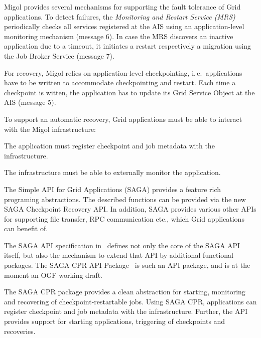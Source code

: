 \documentclass[times, 10pt, twocolumn]{article}
\begin{document}
Migol provides several mechanisms for supporting the fault tolerance of Grid applications.
To detect failures, the \emph{Monitoring and Restart Service (MRS)}
periodically checks all services registered at the AIS using an
application-level monitoring mechanism (message 6). In case the MRS discovers an inactive
application due to a timeout, it initiates a restart respectively a migration using the
Job Broker Service (message 7).  

For recovery, Migol relies on application-level checkpointing, i.\,e.\ applications have to be
written to accommodate checkpointing and restart. 
Each time a checkpoint is witten, the application has to update
its Grid Service Object at the AIS (message 5). 

To support an automatic recovery, Grid applications must be able to interact with the Migol infrastructure:
\begin{compactitem}
    \item The application must register checkpoint and job metadata with the infrastructure.
    \item The infrastructure must be able to externally monitor the application.
\end{compactitem}  
The Simple API for Grid Applications (SAGA) provides a feature rich programing abstractions. The described functions 
can be  provided via the new SAGA Checkpoint Recovery API. In addition, SAGA provides  
various other APIs for supporting file transfer, RPC communication etc., which Grid applications can benefit of.



The SAGA API specification in~\cite{saga_gfd90} defines not only the
core of the SAGA API itself, but also the mechanism to extend that API
by additional functional packages.  The SAGA CPR API
Package~\cite{saga_cpr_draft} is such an API package, and is at the
moment an OGF working draft.

The SAGA CPR package provides a clean abstraction for starting,
monitoring and recovering of checkpoint-restartable jobs.
Using SAGA CPR, applications can register checkpoint and job metadata with the infrastructure. 
Further, the API provides support for starting applications, triggering of checkpoints and recoveries.
\end{document}
